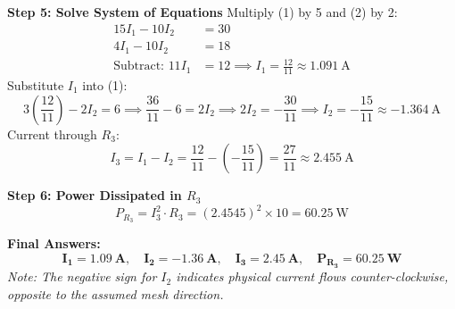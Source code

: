 \begin{example}
\textbf{Step 5: Solve System of Equations}
Multiply (1) by 5 and (2) by 2:
\begin{align*}
    15I_1 - 10I_2 &= 30 \\
    4I_1 - 10I_2 &= 18 \\
    \text{Subtract: } 11I_1 &= 12 \implies I_1 = \frac{12}{11} \approx \SI{1.091}{\ampere}
\end{align*}
Substitute $I_1$ into (1):
\begin{equation*}
    3\left(\frac{12}{11}\right) - 2I_2 = 6 \implies \frac{36}{11} - 6 = 2I_2 \implies 2I_2 = -\frac{30}{11} \implies I_2 = -\frac{15}{11} \approx \SI{-1.364}{\ampere}
\end{equation*}
Current through $R_3$:
\begin{equation*}
    I_3 = I_1 - I_2 = \frac{12}{11} - \left(-\frac{15}{11}\right) = \frac{27}{11} \approx \SI{2.455}{\ampere}
\end{equation*}

\textbf{Step 6: Power Dissipated in $R_3$}
\begin{equation*}
    P_{R_3} = I_3^2 \cdot R_3 = (2.4545)^2 \times 10 = \SI{60.25}{\watt}
\end{equation*}

\textbf{Final Answers:}
$$\mathbf{I_1 = \SI{1.09}{\ampere}, \quad I_2 = \SI{-1.36}{\ampere}, \quad I_3 = \SI{2.45}{\ampere}, \quad P_{R_3} = \SI{60.25}{\watt}}$$
\noindent\textit{Note: The negative sign for $I_2$ indicates physical current flows counter-clockwise, opposite to the assumed mesh direction.}
\end{example}

